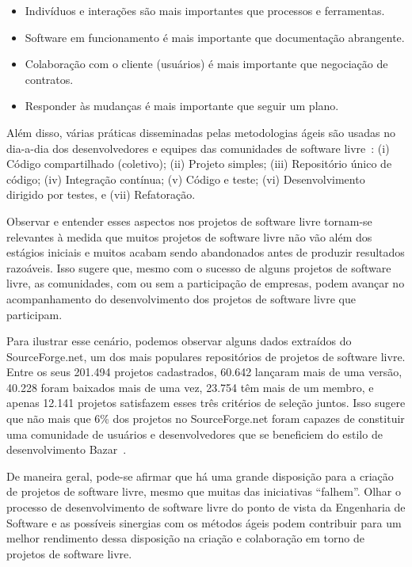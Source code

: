 \begin{itemize}

\item {Indivíduos e interações são mais importantes que processos e ferramentas.}

\item {Software em funcionamento é mais importante que documentação a\-bran\-gen\-te.}

\item {Colaboração com o cliente (usuários) é mais importante que negociação de contratos.}

\item {Responder às mudanças é mais importante que seguir um plano.}

\end{itemize}

Além disso, várias práticas disseminadas pelas metodologias ágeis são usadas no
dia-a-dia dos desenvolvedores e equipes das comunidades
de software livre~\citep{corbucci:2011}:
(i) Código compartilhado (coletivo);
(ii) Projeto simples;
(iii) Repositório único de código;
(iv) Integração contínua;
(v) Código e teste;
(vi) Desenvolvimento dirigido por testes, e
(vii) Refatoração.

Observar e entender esses aspectos nos projetos de software livre tornam-se
relevantes à medida que muitos projetos de software livre não vão além dos
estágios iniciais e muitos acabam sendo abandonados antes de produzir
resultados razoáveis.
%
Isso sugere que, mesmo com o sucesso de alguns projetos de software livre,
as comunidades, com ou sem a participação de empresas, podem avançar no
acompanhamento do desenvolvimento dos projetos de software livre que participam.

Para ilustrar esse cenário, podemos observar alguns dados extraídos do
SourceForge.net, um dos mais populares repositórios de projetos de software livre.
%
Entre os seus 201.494 projetos cadastrados, 60.642
lançaram mais de uma versão, 40.228 foram baixados mais de uma vez, 23.754 têm
mais de um membro, e
apenas 12.141 projetos satisfazem esses três
critérios de seleção juntos. Isso sugere que não mais que 6\% dos
projetos no SourceForge.net foram capazes de constituir uma comunidade de usuários
e desenvolvedores que se beneficiem do estilo de desenvolvimento
Bazar~\citep{CatedralBazzar}.

De maneira geral, pode-se afirmar que há uma grande disposição para a criação de
projetos de software livre, mesmo que muitas das iniciativas ``falhem''.
%
Olhar o processo de desenvolvimento de software livre do ponto de vista da 
Engenharia de Software e as possíveis sinergias com os métodos ágeis podem
contribuir para um melhor rendimento dessa disposição na criação e colaboração
em torno de projetos de software livre.

